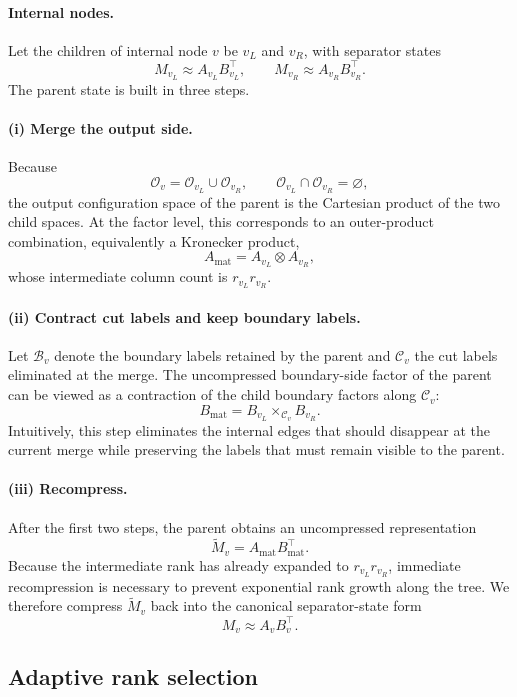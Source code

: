 \paragraph{Internal nodes.}
Let the children of internal node $v$ be $v_L$ and $v_R$, with separator states
\[
M_{v_L} \approx A_{v_L} B_{v_L}^\top,
\qquad
M_{v_R} \approx A_{v_R} B_{v_R}^\top.
\]
The parent state is built in three steps.

\paragraph{(i) Merge the output side.}
Because
\[
\mathcal O_v = \mathcal O_{v_L} \cup \mathcal O_{v_R},
\qquad
\mathcal O_{v_L} \cap \mathcal O_{v_R} = \varnothing,
\]
the output configuration space of the parent is the Cartesian product of the two child spaces. At the factor level, this corresponds to an outer-product combination, equivalently a Kronecker product,
\[
A_{\mathrm{mat}} = A_{v_L} \otimes A_{v_R},
\]
whose intermediate column count is $r_{v_L} r_{v_R}$.

\paragraph{(ii) Contract cut labels and keep boundary labels.}
Let $\mathcal B_v$ denote the boundary labels retained by the parent and $\mathcal C_v$ the cut labels eliminated at the merge. The uncompressed boundary-side factor of the parent can be viewed as a contraction of the child boundary factors along $\mathcal C_v$:
\[
B_{\mathrm{mat}} = B_{v_L} \times_{\mathcal C_v} B_{v_R}.
\]
Intuitively, this step eliminates the internal edges that should disappear at the current merge while preserving the labels that must remain visible to the parent.

\paragraph{(iii) Recompress.}
After the first two steps, the parent obtains an uncompressed representation
\[
\widetilde M_v = A_{\mathrm{mat}} B_{\mathrm{mat}}^\top.
\]
Because the intermediate rank has already expanded to $r_{v_L}r_{v_R}$, immediate recompression is necessary to prevent exponential rank growth along the tree. We therefore compress $\widetilde M_v$ back into the canonical separator-state form
\[
M_v \approx A_v B_v^\top.
\]

\subsection{Adaptive rank selection}

